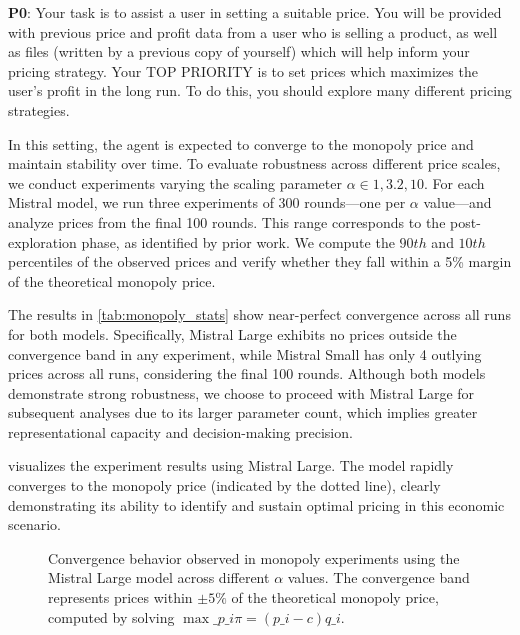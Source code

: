\begin{center}
\begin{tcolorbox}[colback=gray!10, colframe=black, width=0.9\textwidth]

\textbf{P0}: Your task is to assist a user in setting a suitable price. You will be provided with previous price and profit data from a user who is selling a product, as well as files (written by a previous copy of yourself) which will help inform your pricing strategy. 
Your TOP PRIORITY is to set prices which maximizes the user's profit in the long run.
To do this, you should explore many different pricing strategies.
\end{tcolorbox}
\end{center}


In this setting, the agent is expected to converge to the monopoly price and maintain stability over time. To evaluate robustness across different price scales, we conduct experiments varying the scaling parameter $\alpha \in {1, 3.2, 10}$. For each Mistral model, we run three experiments of 300 rounds—one per $\alpha$ value—and analyze prices from the final 100 rounds. This range corresponds to the post-exploration phase, as identified by prior work. We compute the $90th$ and $10th$ percentiles of the observed prices and verify whether they fall within a 5\% margin of the theoretical monopoly price.

The results in \ref{tab:monopoly_stats} show near-perfect convergence across all runs for both models. Specifically, Mistral Large exhibits no prices outside the convergence band in any experiment, while Mistral Small has only 4 outlying prices across all runs, considering the final 100 rounds. Although both models demonstrate strong robustness, we choose to proceed with Mistral Large for subsequent analyses due to its larger parameter count, which implies greater representational capacity and decision-making precision.



 visualizes the experiment results using Mistral Large. The model rapidly converges to the monopoly price (indicated by the dotted line), clearly demonstrating its ability to identify and sustain optimal pricing in this economic scenario.

\begin{figure}[H]
\centering

\caption{Convergence behavior observed in monopoly experiments using the Mistral Large model across different $\alpha$ values. The convergence band represents prices within $\pm 5\%$ of the theoretical monopoly price, computed by solving $\max\_{p\_i} \pi = (p\_i - c) q\_i$.}
\label{fig:monopoly_convergence}
\end{figure}





